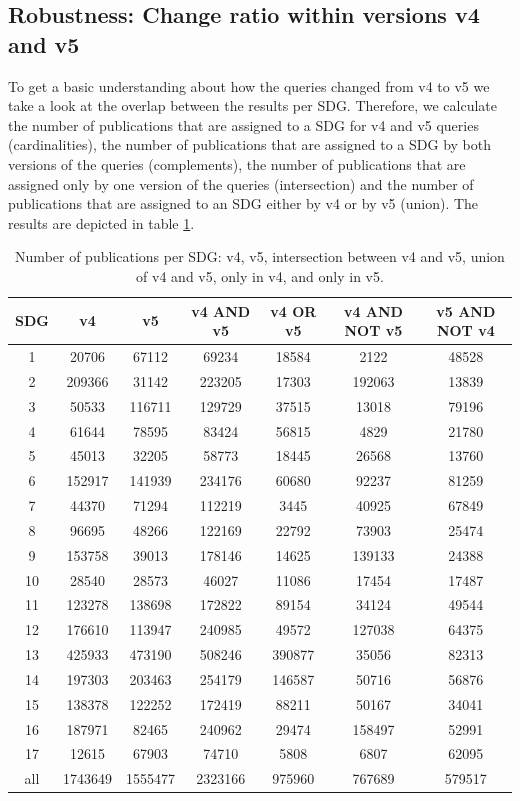 \documentclass{article}
\begin{document}
\subsection{Robustness: Change ratio within versions v4 and v5}
\label{sec:robustness}
To get a basic understanding about how the queries changed from v4 to v5 we take a look at the overlap between the results per SDG. Therefore, we calculate the number of publications that are assigned to a SDG for v4 and v5 queries (cardinalities), the number of publications that are assigned to a SDG by both versions of the queries (complements), the number of publications that are assigned only by one version of the queries (intersection) and the number of publications that are assigned to an SDG either by v4 or by v5 (union). The results are depicted in table \ref{venndataofpublications}.
\begin{table}[H]
\centering 
 \begin{tabular}{ccccccc}
 \toprule
  SDG & v4 & v5 & v4 AND v5 & v4 OR v5 & v4 AND NOT v5 & v5 AND NOT v4 \\
  \hline
 1 & 20706 & 67112 & 69234 & 18584 & 2122 & 48528 \\
 2 & 209366 & 31142 & 223205 & 17303 & 192063 & 13839 \\
 3 & 50533 & 116711 & 129729 & 37515 & 13018 & 79196 \\
 4 & 61644 & 78595 & 83424 & 56815 & 4829 & 21780 \\
 5 & 45013 & 32205 & 58773 & 18445 & 26568 & 13760 \\
 6 & 152917 & 141939 & 234176 & 60680 & 92237 & 81259 \\
 7 & 44370 & 71294 & 112219 & 3445 & 40925 & 67849 \\
 8 & 96695 & 48266 & 122169 & 22792 & 73903 & 25474 \\
 9 & 153758 & 39013 & 178146 & 14625 & 139133 & 24388 \\
 10 & 28540 & 28573 & 46027 & 11086 & 17454 & 17487 \\
 11 & 123278 & 138698 & 172822 & 89154 & 34124 & 49544 \\
 12 & 176610 & 113947 & 240985 & 49572 & 127038 & 64375 \\
 13 & 425933 & 473190 & 508246 & 390877 & 35056 & 82313 \\
 14 & 197303 & 203463 & 254179 & 146587 & 50716 & 56876 \\
 15 & 138378 & 122252 & 172419 & 88211 & 50167 & 34041 \\
 16 & 187971 & 82465 & 240962 & 29474 & 158497 & 52991 \\
 17 & 12615 & 67903 & 74710 & 5808 & 6807 & 62095 \\
 all & 1743649 & 1555477 & 2323166 & 975960 & 767689 & 579517 \\
 \bottomrule
\end{tabular}\caption{Number of publications per SDG: v4, v5, intersection between v4 and v5, union of v4 and v5, only in v4, and only in v5.}
\label{venndataofpublications}
\end{table}
\end{document}
